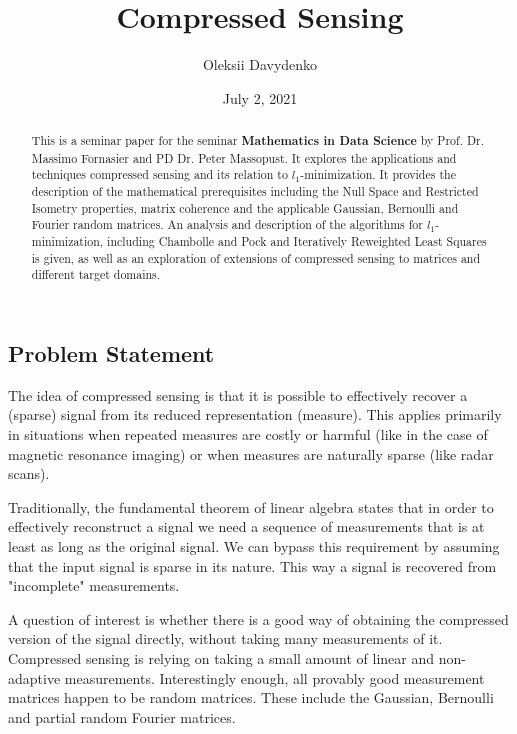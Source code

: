 \documentclass[
  english,        %
  font=times,     %
  onecolumn,      %
]{tumarticle}
\title{Compressed Sensing}
\subtitle{}
\author[]{Oleksii Davydenko}
\date{July 2, 2021}
\numberwithin{equation}{section} %
\begin{document}
\maketitle

\begin{large}
\begin{adjustwidth}{0pt}{0pt} %

\begin{abstract}
  This is a seminar paper for the seminar \textbf{Mathematics in Data Science} by Prof. Dr. Massimo Fornasier and PD Dr. Peter Massopust. It explores the applications and techniques compressed sensing and its relation to $l_1$-minimization. It provides the description of the mathematical prerequisites including the Null Space and Restricted Isometry properties, matrix coherence and the applicable Gaussian, Bernoulli and Fourier random matrices. An analysis and description of the algorithms for $l_1$-minimization, including Chambolle and Pock and Iteratively Reweighted Least Squares is given, as well as an exploration of extensions of compressed sensing to matrices and different target domains.
\end{abstract}

\section{Problem Statement}



\par The idea of compressed sensing is that it is possible to effectively recover a (sparse) signal from its reduced representation (measure). This applies primarily in situations when repeated measures are costly or harmful (like in the case of magnetic resonance imaging) or when measures are naturally sparse (like radar scans). \cite{CS}


Traditionally, the fundamental theorem of linear algebra states that in order to effectively reconstruct a signal we need a sequence of measurements that is at least as long as the original signal. We can bypass this requirement by assuming that the input signal is sparse in its nature. This way a signal is recovered from "incomplete" measurements.

A question of interest is whether there is a good way of obtaining the compressed version of the signal directly, without taking many measurements of it. Compressed sensing is relying on taking a small amount of linear and non-adaptive measurements. Interestingly enough, all provably good measurement matrices happen to be random matrices. These include the Gaussian, Bernoulli and partial random Fourier matrices. 


\end{adjustwidth}
\end{large}
\end{document}
